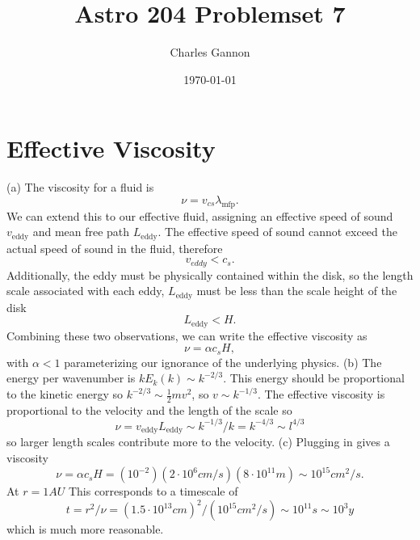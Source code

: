 \documentclass[11pt]{article}
\author{Charles Gannon}
\date{\today}
\title{Astro 204 Problemset 7}
\begin{document}
\maketitle
\tableofcontents

\section{Effective Viscosity}
\label{sec:org67aae07}
(a) The viscosity for a fluid is
\begin{equation}
 \nu = v_{cs} \lambda_{\text{mfp}}.
\end{equation}
We can extend this to our effective fluid, assigning an effective speed of sound \(v_{\text{eddy}}\) and mean free path \(L_{\text{eddy}}\).
The effective speed of sound cannot exceed the actual speed of sound in the fluid, therefore
\begin{equation}
 v_{eddy} < c_s.
\end{equation}
Additionally, the eddy must be physically contained within the disk, so the length scale associated with each eddy, \(L_{\text{eddy}}\) must be less than the scale height of the disk
\begin{equation}
 L_{\text{eddy}} < H.
\end{equation}
Combining these two observations, we can write the effective viscosity as
\begin{equation}
 \nu = \alpha c_s H,
\end{equation}
with \(\alpha < 1\) parameterizing our ignorance of the underlying physics.
\newline
(b) The energy per wavenumber is \(k E_k (k) \sim k^{-2/3}\).
This energy should be proportional to the kinetic energy so \(k^{-2/3} \sim \frac{1}{2} m v^2\), so \(v \sim k^{-1/3}\).
The effective viscosity is proportional to the velocity and the length of the scale so
\begin{equation}
 \nu = v_{\text{eddy}} L_{\text{eddy}} \sim k^{-1/3} / k = k^{-4/3} \sim l^{4/3}
\end{equation}
so larger length scales contribute more to the velocity.
\newline
(c) Plugging in gives a viscosity
\begin{equation}
 \nu = \alpha c_s H = (10^{-2}) (2 \cdot 10^{6} cm/s) (8 \cdot 10^{11} m) \sim 10^{15} cm^2 / s.
\end{equation}
At \(r=1AU\) This corresponds to a timescale of
\begin{equation}
 t = r^2 / \nu = \left(1.5 \cdot 10^{13} cm \right)^2 / \left( 10^{15} cm^2/s  \right) \sim 10^{11} s \sim 10^{3} y
\end{equation}
which is much more reasonable.
\end{document}
